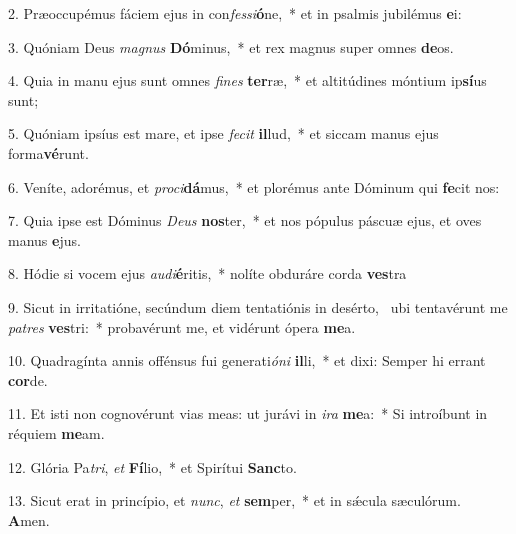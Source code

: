 2. Præoccupémus fáciem ejus in con\textit{fes}\textit{si}\textbf{ó}ne,~*  et in psalmis jubilémus \textbf{e}i:\

3. Quóniam Deus \textit{ma}\textit{gnus} \textbf{Dó}minus,~*  et rex magnus super omnes \textbf{de}os.\

4. Quia in manu ejus sunt omnes \textit{fi}\textit{nes} \textbf{ter}ræ,~*  et altitúdines móntium ip\textbf{sí}us sunt;\

5. Quóniam ipsíus est mare, et ipse \textit{fe}\textit{cit} \textbf{il}lud,~*  et siccam manus ejus forma\textbf{vé}runt.\

6. Veníte, adorémus, et \textit{pro}\textit{ci}\textbf{dá}mus,~*  et plorémus ante Dóminum qui \textbf{fe}cit nos:\

7. Quia ipse est Dóminus \textit{De}\textit{us} \textbf{nos}ter,~*  et nos pópulus páscuæ ejus, et oves manus \textbf{e}jus.\

8. Hódie si vocem ejus \textit{au}\textit{di}\textbf{é}ritis,~*  nolíte obduráre corda \textbf{ves}tra\

9. Sicut in irritatióne, secúndum diem tentatiónis in desérto, \dag\  ubi tentavérunt me \textit{pa}\textit{tres} \textbf{ves}tri:~*  probavérunt me, et vidérunt ópera \textbf{me}a.\

10. Quadragínta annis offénsus fui generati\textit{ó}\textit{ni} \textbf{il}li,~*  et dixi: Semper hi errant \textbf{cor}de.\

11. Et isti non cognovérunt vias meas: ut jurávi in \textit{i}\textit{ra} \textbf{me}a:~*  Si introíbunt in réquiem \textbf{me}am.\

12. Glória Pa\textit{tri}, \textit{et} \textbf{Fí}lio,~*  et Spirítui \textbf{Sanc}to.\

13. Sicut erat in princípio, et \textit{nunc}, \textit{et} \textbf{sem}per,~*  et in sǽcula sæculórum. \textbf{A}men.\

